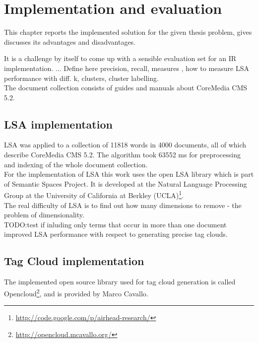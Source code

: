 \chapter{Implementation and evaluation}
\label{sec:implementation}

\begin{summary}
This chapter reports the implemented solution for the given thesis problem, gives discusses its advantages and disadvantages.
\end{summary}

It is a challenge by itself to come up with a sensible evaluation set for an IR implementation. ... Define here precision, recall, measures , how to measure LSA performance with  diff. k, clusters, cluster labelling. \\


The document collection consists of guides and manuals about CoreMedia \gls{CMS} 5.2.\\

\section{LSA implementation}
\label{sec:implementation:lsa_impl}
\gls{LSA} was applied to a collection of 11818 words in 4000 documents, all of which describe CoreMedia \gls{CMS} 5.2. The algorithm took  63552 ms for preprocessing and indexing of the whole document collection. \\

For the implementation of LSA this work uses the open LSA library which is part of Semantic Spaces Project\cite{S-Space}. It is developed at the Natural Language Processing Group at the University of California at Berkley (UCLA)\footnote{\url{http://code.google.com/p/airhead-research/}}.\\

The real difficulty of LSA is to find out how many dimensions to remove - the problem of dimensionality.\\

TODO:test if inluding only terms that occur in more than one document improved \gls{LSA} performance with respect to generating precise tag clouds.\\

\section{Tag Cloud implementation}
\label{sec:implementation:tag_cloud}
The implemented open source library used for tag cloud generation is called Opencloud\footnote{\url{http://opencloud.mcavallo.org/}}, and is provided by Marco Cavallo.\\

